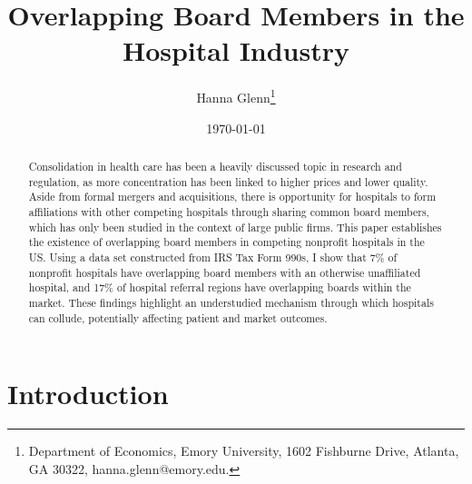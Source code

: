 \documentclass[12pt]{article}
\begin{document}
	
	
	
	
	\linespread{1.2}\title{\vspace{-0.5in} Overlapping Board Members in the Hospital Industry} 
	
	\date{\today}
	
	\author{\vspace{10mm}Hanna Glenn\footnote{Department of Economics, Emory University, 1602 Fishburne Drive, Atlanta, GA 30322, hanna.glenn@emory.edu.} }
	
	\maketitle
	
	\vspace{-0.2in}
	
	\singlespacing\maketitle


 \vspace{3mm}
	
    \begin{abstract}
		{\small
    Consolidation in health care has been a heavily discussed topic in research and regulation, as more concentration has been linked to higher prices and lower quality. Aside from formal mergers and acquisitions, there is opportunity for hospitals to form affiliations with other competing hospitals through sharing common board members, which has only been studied in the context of large public firms. This paper establishes the existence of overlapping board members in competing nonprofit hospitals in the US. Using a data set constructed from IRS Tax Form 990s, I show that 7\% of nonprofit hospitals have overlapping board members with an otherwise unaffiliated hospital, and 17\% of hospital referral regions have overlapping boards within the market. These findings highlight an understudied mechanism through which hospitals can collude, potentially affecting patient and market outcomes. 
		} 
	\end{abstract}
	
	
	
	
	

	
	\onehalfspacing
	
	\newpage

    \section{Introduction}
\end{document}
